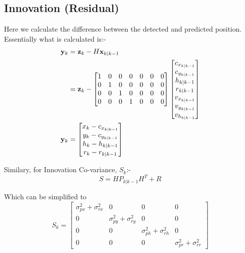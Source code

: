 \documentclass[10pt]{article}
\begin{document}
    \subsection{Innovation (Residual)}
    
    Here we calculate the difference between the detected and predicted position. Essentially what is calculated is:-
    \begin{align}
        \mathbf{y}_k &= \mathbf{z}_k - H\mathbf{x}_{k|k-1} \notag\\
                    &= \mathbf{z}_k - \begin{bmatrix}
                        1 & 0 & 0 & 0 & 0 & 0 & 0 \\
                        0 & 1 & 0 & 0 & 0 & 0 & 0 \\
                        0 & 0 & 1 & 0 & 0 & 0 & 0 \\
                        0 & 0 & 0 & 1 & 0 & 0 & 0 
                    \end{bmatrix}\begin{bmatrix}
                        c_{x_{k|k-1}} \\
                        c_{y_{k|k-1}} \\
                        h_{k|k-1} \\
                        r_{k|k-1} \\
                        v_{x_{k|k-1}} \\
                        v_{y_{k|k-1}} \\
                        v_{h_{k|k-1}}
                    \end{bmatrix} \notag\\
        \mathbf{y}_k &= \begin{bmatrix}
            x_k - c_{x_{k|k-1}} \\
            y_k - c_{y_{k|k-1}} \\
            h_k - h_{k|k-1}  \\
            r_k - r_{k|k-1} \\
        \end{bmatrix}
        \label{Eq:Innovation_yk}
    \end{align}

    \noindent Similary, for Innovation Co-variance, \(S_k\):-
    \[
        S = HP_{k|k-1}H^T + R
    \]

    \noindent Which can be simplified to 
    \begin{equation}
        S_k = \begin{bmatrix}
            \sigma^2_{px} + \sigma^2_{rx} & 0 & 0 & 0 \\
            0 & \sigma^2_{py} + \sigma^2_{ry} & 0 & 0 \\
            0 & 0 & \sigma^2_{ph} + \sigma^2_{rh} & 0 \\
            0 & 0 & 0 & \sigma^2_{pr} + \sigma^2_{rr}
        \end{bmatrix}
        \label{Eq:Innovation_Cov_Actual}
    \end{equation}
\end{document}
